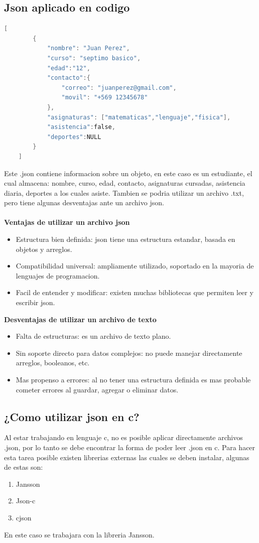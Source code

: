 \subsection*{Json aplicado en codigo}
\begin{lstlisting}[style=CodeStyle, language=C, caption={Ejemplo de .json}, label={lst:codigo}]
    [
        {
            "nombre": "Juan Perez",
            "curso": "septimo basico",
            "edad":"12",
            "contacto":{
                "correo": "juanperez@gmail.com",
                "movil": "+569 12345678"
            },
            "asignaturas": ["matematicas","lenguaje","fisica"],
            "asistencia":false,
            "deportes":NULL
        }
    ]
\end{lstlisting}
Este .json contiene informacion sobre un objeto, en este caso es un estudiante, el cual almacena: nombre, curso, edad, contacto, asignaturas cursadas, asistencia diaria, deportes a los cuales asiste.
Tambien se podria utilizar un archivo .txt, pero tiene algunas desventajas ante un archivo json.\\\\
\textbf{Ventajas de utilizar un archivo json}
    \begin{itemize}
        \item Estructura bien definida: json tiene una estructura estandar, basada en  objetos y arreglos.
        \item Compatibilidad universal: ampliamente utilizado, soportado en la mayoria de lenguajes de programacion.
        \item Facil de entender y modificar: existen muchas bibliotecas que permiten leer y escribir json.
    \end{itemize}
    \textbf{Desventajas de utilizar un archivo de texto}
    \begin{itemize}
        \item  Falta de estructuras: es un archivo de texto plano.
        \item  Sin soporte directo para datos complejos: no puede manejar directamente  arreglos, booleanos, etc.
        \item  Mas propenso a errores: al no tener una estructura definida es mas probable cometer errores al guardar, agregar o eliminar datos.
    \end{itemize}

\newpage

\subsection*{¿Como utilizar json en \textbf{c}?}
Al estar trabajando en lenguaje c, no es posible aplicar directamente archivos .json, por lo tanto se debe
encontrar la forma de poder leer .json en c. 
Para hacer esta tarea posible existen librerias externas las cuales se deben instalar, algunas de estas son:
\begin{enumerate}
    \item Jansson
    \item Json-c
    \item cjson
\end{enumerate}
En este caso se trabajara con la libreria Jansson.

